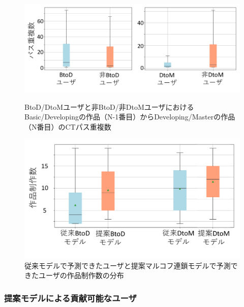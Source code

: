 \documentclass[submit]{ipsj}
\begin{document}
\begin{figure}[t]
	\centering
	\includegraphics[width=1\linewidth]{Okamoto_fig/add-btod-dtom.pdf}
        \vspace{-7mm}
	\caption{BtoD/DtoMユーザと非BtoD/非DtoMユーザにおけるBasic/Developingの作品（N-1番目）からDeveloping/Masterの作品（N番目）のCTパス重複数}
	\label{fig:add-btod}

 \centering
	\includegraphics[width=0.75\linewidth]{Okamoto_fig/btod-dtom-path.pdf}
	\caption{従来モデルで予測できたユーザと提案マルコフ連鎖モデルで予測できたユーザの作品制作数の分布}
	\label{fig:btod-path}
    \vspace{-4mm}
\end{figure}

\subsubsection{提案モデルによる貢献可能なユーザ}
\end{document}
